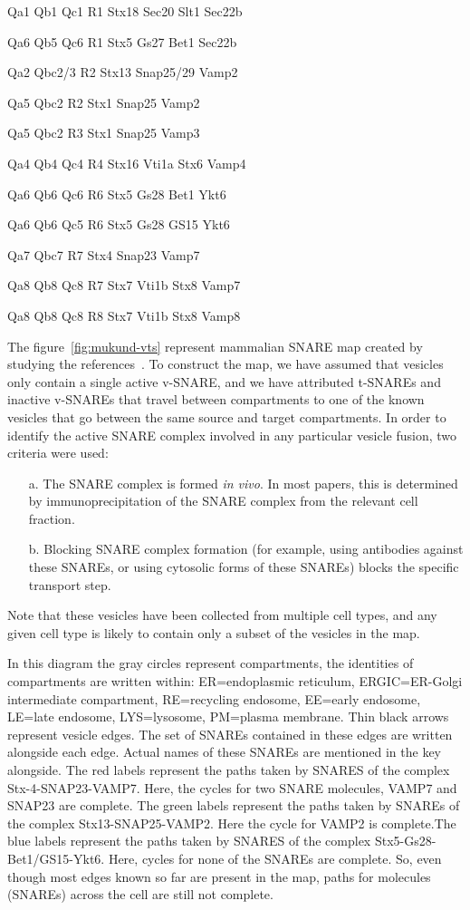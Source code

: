Qa1 Qb1 Qc1 R1
Stx18 Sec20 Slt1 Sec22b

Qa6 Qb5 Qc6 R1
Stx5 Gs27 Bet1 Sec22b

Qa2 Qbc2/3 R2
Stx13 Snap25/29 Vamp2

Qa5 Qbc2 R2
Stx1 Snap25 Vamp2

Qa5 Qbc2 R3
Stx1 Snap25 Vamp3

Qa4 Qb4 Qc4 R4
Stx16 Vti1a Stx6 Vamp4

Qa6 Qb6 Qc6 R6
Stx5 Gs28 Bet1 Ykt6

Qa6 Qb6 Qc5 R6
Stx5 Gs28 GS15 Ykt6

Qa7 Qbc7 R7
Stx4 Snap23 Vamp7

Qa8 Qb8 Qc8 R7
Stx7 Vti1b Stx8 Vamp7

Qa8 Qb8 Qc8 R8
Stx7 Vti1b Stx8 Vamp8	
  
The figure~\ref{fig:mukund-vts} represent mammalian SNARE map created by studying the references~\cite{somya}. 
To construct the map, we have assumed that vesicles only contain a single
active v-SNARE, and we have attributed t-SNAREs and inactive v-SNAREs that
travel between compartments to one of the known vesicles that go between
the same source and target compartments.
In order to identify the active SNARE complex involved in any particular
vesicle fusion, two criteria were used: 
\begin{enumerate}
\item[a.] The SNARE complex is formed \textit{in vivo}. In most papers, this is determined by immunoprecipitation of the SNARE complex from the relevant cell fraction. 
\item[b.] Blocking SNARE complex formation (for example, using antibodies against these SNAREs, or
using cytosolic forms of these SNAREs) blocks the specific transport step.
\end{enumerate}


Note that these vesicles have been collected from multiple cell types, and
any given cell type is likely to contain only a subset of the vesicles in
the map.

In this diagram the gray circles represent compartments, the identities of compartments are
written within: ER=endoplasmic reticulum, ERGIC=ER-Golgi intermediate compartment,
RE=recycling endosome, EE=early endosome, LE=late endosome, LYS=lysosome, PM=plasma
membrane. Thin black arrows represent vesicle edges.
The set of SNAREs contained in these edges are written alongside each edge. Actual names
of these SNAREs are mentioned in the key alongside. The red labels represent the paths taken by
SNARES of the complex Stx-4-SNAP23-VAMP7. Here, the cycles for two SNARE molecules,
VAMP7 and SNAP23 are complete. The green labels represent the paths taken by SNAREs of the
complex Stx13-SNAP25-VAMP2. Here the cycle for VAMP2 is complete.The blue labels represent
the paths taken by SNARES of the complex Stx5-Gs28-Bet1/GS15-Ykt6. Here, cycles for none of
the SNAREs are complete. So, even though most edges known so far are present in the map, paths for molecules (SNAREs) across the cell are still not complete.

